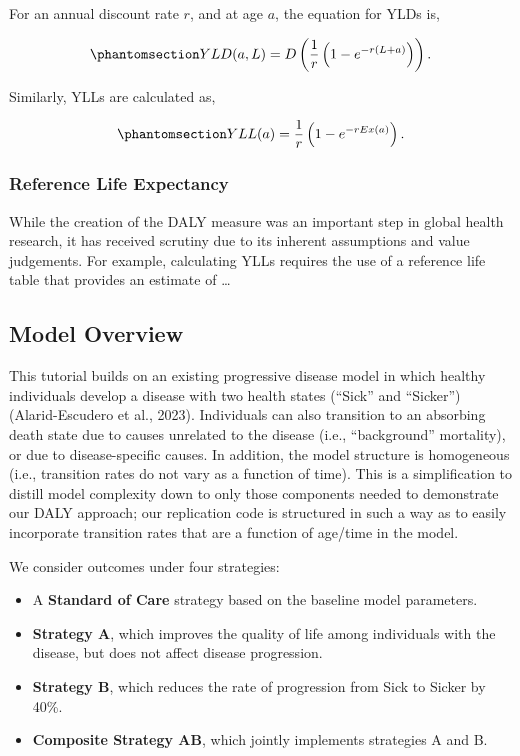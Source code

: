 \documentclass[
]{agujournal2019}
\providecommand{\tightlist}{%
  \setlength{\itemsep}{0pt}\setlength{\parskip}{0pt}}\usepackage{longtable,booktabs,array}
\begin{document}
For an annual discount rate \(r\), and at age \(a\), the equation for
YLDs is,

\begin{equation}\phantomsection\label{eq-yld}{
YLD(a,L) = D  \left ( \frac{1}{r}\left(1-e^{-r(L+a) }\right) \right ).
}\end{equation}

Similarly, YLLs are calculated as,

\begin{equation}\phantomsection\label{eq-yll}{
YLL(a)= \frac{1}{r}\left(1-e^{-r Ex(a)}\right).
}\end{equation}

\subsubsection{Reference Life
Expectancy}\label{reference-life-expectancy}

While the creation of the DALY measure was an important step in global
health research, it has received scrutiny due to its inherent
assumptions and value judgements. For example, calculating YLLs requires
the use of a reference life table that provides an estimate of \ldots{}

\subsection{Model Overview}\label{model-overview}

This tutorial builds on an existing progressive disease model in which
healthy individuals develop a disease with two health states (``Sick''
and ``Sicker'') (Alarid-Escudero et al., 2023). Individuals can also
transition to an absorbing death state due to causes unrelated to the
disease (i.e., ``background'' mortality), or due to disease-specific
causes. In addition, the model structure is homogeneous (i.e.,
transition rates do not vary as a function of time). This is a
simplification to distill model complexity down to only those components
needed to demonstrate our DALY approach; our replication code is
structured in such a way as to easily incorporate transition rates that
are a function of age/time in the model.

We consider outcomes under four strategies:

\begin{itemize}
\tightlist
\item
  A \textbf{Standard of Care} strategy based on the baseline model
  parameters.
\item
  \textbf{Strategy A}, which improves the quality of life among
  individuals with the disease, but does not affect disease progression.
\item
  \textbf{Strategy B}, which reduces the rate of progression from Sick
  to Sicker by 40\%.
\item
  \textbf{Composite Strategy AB}, which jointly implements strategies A
  and B.
\end{itemize}
\end{document}
